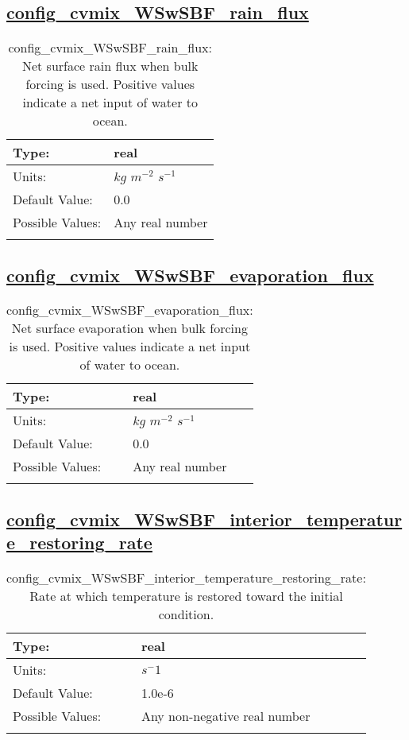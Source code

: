\subsection[config\_cvmix\_WSwSBF\_rain\_flux]{\hyperref[sec:nm_tab_cvmix_WSwSBF]{config\_cvmix\_WSwSBF\_rain\_flux}}
\label{subsec:nm_sec_config_cvmix_WSwSBF_rain_flux}
\begin{center}
\begin{longtable}{| p{2.0in} || p{4.0in} |}
    \hline
    Type: & real \\
    \hline
    Units: & $kg$ $m^{-2}$ $s^{-1}$ \\
    \hline
    Default Value: & 0.0 \\
    \hline
    Possible Values: & Any real number \\
    \hline
    \caption{config\_cvmix\_WSwSBF\_rain\_flux: Net surface rain flux when bulk forcing is used. Positive values indicate a net input of water to ocean.}
\end{longtable}
\end{center}
\subsection[config\_cvmix\_WSwSBF\_evaporation\_flux]{\hyperref[sec:nm_tab_cvmix_WSwSBF]{config\_cvmix\_WSwSBF\_evaporation\_flux}}
\label{subsec:nm_sec_config_cvmix_WSwSBF_evaporation_flux}
\begin{center}
\begin{longtable}{| p{2.0in} || p{4.0in} |}
    \hline
    Type: & real \\
    \hline
    Units: & $kg$ $m^{-2}$ $s^{-1}$ \\
    \hline
    Default Value: & 0.0 \\
    \hline
    Possible Values: & Any real number \\
    \hline
    \caption{config\_cvmix\_WSwSBF\_evaporation\_flux: Net surface evaporation when bulk forcing is used. Positive values indicate a net input of water to ocean.}
\end{longtable}
\end{center}
\subsection[config\_cvmix\_WSwSBF\_interior\_temperature\_restoring\_rate]{\hyperref[sec:nm_tab_cvmix_WSwSBF]{config\_cvmix\_WSwSBF\_interior\_temperature\_restoring\_rate}}
\label{subsec:nm_sec_config_cvmix_WSwSBF_interior_temperature_restoring_rate}
\begin{center}
\begin{longtable}{| p{2.0in} || p{4.0in} |}
    \hline
    Type: & real \\
    \hline
    Units: & ${s}^-1$ \\
    \hline
    Default Value: & 1.0e-6 \\
    \hline
    Possible Values: & Any non-negative real number \\
    \hline
    \caption{config\_cvmix\_WSwSBF\_interior\_temperature\_restoring\_rate: Rate at which temperature is restored toward the initial condition.}
\end{longtable}
\end{center}
